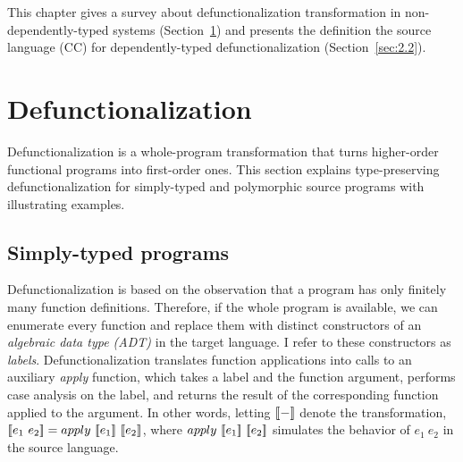 
This chapter gives a survey about defunctionalization transformation in non-dependently-typed systems (Section~\ref{sec:2.1}) and presents the definition the source language (CC) for dependently-typed defunctionalization (Section~\ref{sec:2.2}).

\section{Defunctionalization}
\label{sec:2.1}

Defunctionalization is a whole-program transformation that turns higher-order functional programs into first-order ones. This section explains type-preserving defunctionalization for simply-typed and polymorphic source programs with illustrating examples.

\subsection{Simply-typed programs}

Defunctionalization is based on the observation that a program has only finitely many function definitions. Therefore, if the whole program is available, we can enumerate every function and replace them with distinct constructors of an \textit{algebraic data type (ADT)} in the target language. I refer to these constructors as \textit{labels}. Defunctionalization translates function applications into calls to an auxiliary \textit{apply} function, which takes a label and the function argument, performs case analysis on the label, and returns the result of the corresponding function applied to the argument. In other words, letting ${[\![ - ]\!]}$ denote the transformation, $ \bbracket{e_1\ e_2} = apply\ \bbracket{e_1}\ \bbracket{e_2} $, where $apply\ {[\![ e_1 ]\!]}\ {[\![ e_2 ]\!]}$ simulates the behavior of $e_1\ e_2$ in the source language.

